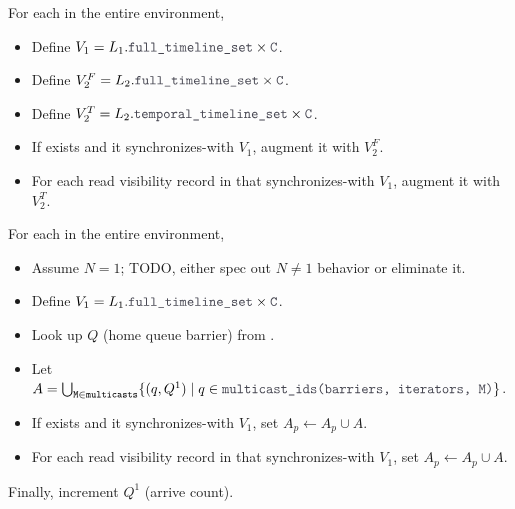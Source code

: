 \filbreak
{} For each  in the entire environment,
\begin{itemize}
  \item Define $V_1 = L_1.\lighttt{full\_timeline\_set} \times \lighttt{C}$.
  \filbreak
  \item Define $V_2^F = L_2.\lighttt{full\_timeline\_set} \times \lighttt{C}$.
  \filbreak
  \item Define $V_2^T = L_2.\lighttt{temporal\_timeline\_set} \times \lighttt{C}$.
  \filbreak
  \item If  exists and it synchronizes-with $V_1$, augment it with $V_2^F$.
  \filbreak
  \item For each read visibility record in  that synchronizes-with $V_1$, augment it with $V_2^T$.
\end{itemize}

\filbreak
{} For each  in the entire environment,
\begin{itemize}
  \item Assume $N=1$; TODO, either spec out $N \ne 1$ behavior or eliminate it.
  \filbreak
  \item Define $V_1 = L_1.\lighttt{full\_timeline\_set} \times \lighttt{C}$.
  \filbreak
  \item Look up $Q$ (home queue barrier) from .
  \item Let $A = \bigcup_{\blacktt{M} \in \blacktt{multicasts}} \{ (q, Q^1) \mid q \in \lighttt{multicast\_ids(barriers, iterators, M)} \}$.
  \filbreak
  \item If  exists and it synchronizes-with $V_1$, set $A_p \leftarrow A_p \cup A$.
  \filbreak
  \item For each read visibility record in  that synchronizes-with $V_1$, set $A_p \leftarrow A_p \cup A$.
\end{itemize}
Finally, increment $Q^1$ (arrive count).


